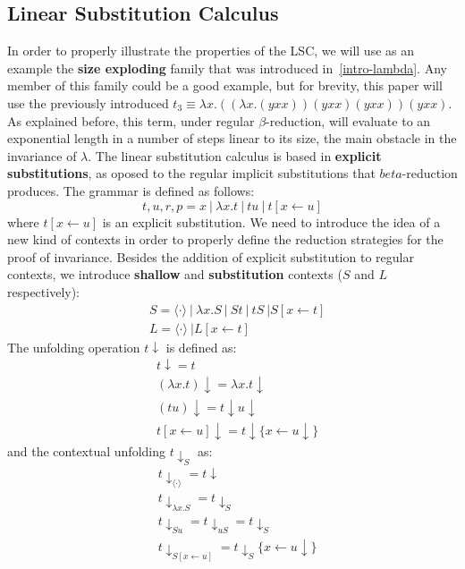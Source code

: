 \documentclass[11pt]{article}
\begin{document}
\subsection{Linear Substitution Calculus}
In order to properly illustrate the properties of the LSC, we will use as an example the \textbf{size exploding} family that was introduced in~\ref{intro-lambda}. Any member of this family could be a good example, but for brevity, this paper will use the previously introduced $t_{3} \equiv \lambda x.((\lambda x. (yxx))(yxx)(yxx))(yxx)$. As explained before, this term, under regular $\beta$-reduction, will evaluate to an exponential length in a number of steps linear to its size, the main obstacle in the invariance of $\lambda$.
The linear substitution calculus is based in \textbf{explicit substitutions}, as oposed to the regular implicit substitutions that $beta$-reduction produces. The grammar is defined as follows:
\begin{equation}
  t, u, r, p = x \ | \ \lambda x.t \ | \ tu \ | \ t[x \leftarrow u]
\end{equation}
where $t[x \leftarrow u]$ is an explicit substitution.
We need to introduce the idea of a new kind of contexts in order to properly define the reduction strategies for the proof of invariance. Besides the addition of explicit substitution to regular contexts, we introduce \textbf{shallow} and \textbf{substitution} contexts ($S$ and $L$ respectively):
\begin{equation}
  \begin{split}
    &S = \langle \cdot \rangle \ | \ \lambda x.S \ | \ St \ | \ tS \ | S[x \leftarrow t] \\
    &L = \langle \cdot \rangle \ | L[x \leftarrow t]
  \end{split}
\end{equation}
The unfolding operation $t\downarrow$ is defined as:
\begin{equation}
  \begin{split}
    &t\downarrow = t \\
    &(\lambda x .t)\downarrow = \lambda x.t\downarrow \\
    &(tu)\downarrow = t\downarrow u \downarrow \\
    &t[x \leftarrow u]\downarrow = t\downarrow \{x \leftarrow u \downarrow \}
  \end{split}
\end{equation}
and the contextual unfolding $t\downarrow_S$ as:
\begin{equation}
  \begin{split}
    &t\downarrow_{\langle \cdot \rangle} = t\downarrow \\
    &t\downarrow_{\lambda x.S} = t\downarrow_S \\
    &t\downarrow_{Su} = t\downarrow_{uS} = t\downarrow_S \\
    &t\downarrow_{S[x \leftarrow u]} = t\downarrow_S \{x \leftarrow u \downarrow \}
  \end{split}
\end{equation}
\end{document}
